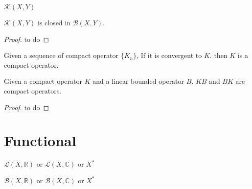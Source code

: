 \begin{notation}
$\mathcal{K}(X, Y)$
\end{notation}

\begin{theorem}
$\mathcal{K}(X, Y)$ is closed in $\mathcal{B}(X, Y)$. 
\end{theorem}

\begin{proof}
to do
\end{proof}

\begin{corollary}
Given a sequence of compact operator $\{K_n\}$, If it is convergent to $K$. then $K$ is a compact operator. 
\end{corollary}

\begin{example}
\end{example}

\begin{theorem}
Given a compact operator $K$ and a linear bounded operator $B$. $K B$ and $B K$ are compact operators. 
\end{theorem}

\begin{proof}
to do
\end{proof}

\section{Functional}

\begin{definition}
\end{definition}

\begin{definition}
\end{definition}

\begin{notation}
$\mathcal{L}(X, \mathbb{R})$ or $\mathcal{L}(X, \mathbb{C})$ or $X^*$
\end{notation}

\begin{notation}
$\mathcal{B}(X, \mathbb{R})$ or $\mathcal{B}(X, \mathbb{C})$ or $X^*$
\end{notation}

\begin{definition}
\end{definition}

